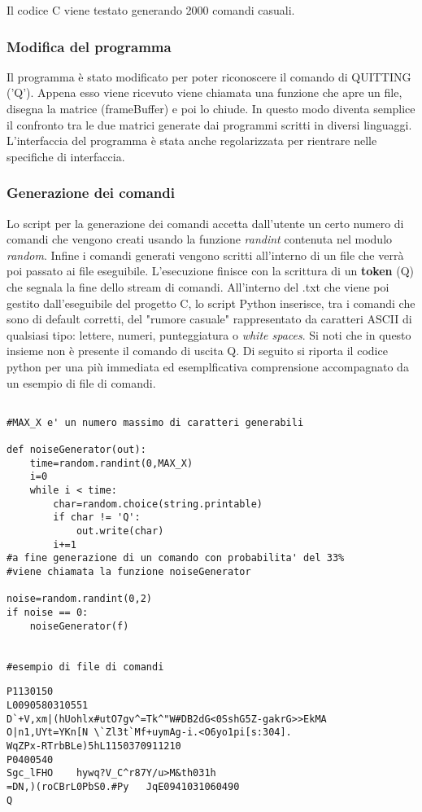 \documentclass{article}
\begin{document}
	Il codice C viene testato generando 2000 comandi casuali.

	\subsubsection*{Modifica del programma}
		Il programma è stato modificato per poter riconoscere il comando di QUITTING ('Q'). Appena esso viene ricevuto
		viene chiamata una funzione che apre un file, disegna la matrice (frameBuffer) e poi lo chiude. In questo modo 
		diventa semplice il confronto tra le due matrici generate dai programmi scritti in diversi linguaggi.
		L'interfaccia del programma è stata anche regolarizzata per rientrare nelle specifiche di interfaccia.

	\subsubsection*{Generazione dei comandi}
		Lo script per la generazione dei comandi accetta dall'utente un certo numero di comandi che vengono creati usando la funzione \textit{randint} contenuta nel modulo \textit{random}. Infine i comandi generati vengono scritti all'interno di un file che verrà poi passato ai file eseguibile.
		L'esecuzione finisce con la scrittura di un \textbf{token} (Q) che segnala la fine dello stream di comandi.
		All'interno del .txt che viene poi gestito dall'eseguibile del progetto C, lo script Python inserisce, tra i comandi che sono di default corretti, del "rumore casuale" rappresentato da caratteri ASCII di qualsiasi tipo: lettere, numeri, punteggiatura o \textit{white spaces}. Si noti che in questo insieme non è presente il comando di uscita Q.
		Di seguito si riporta il codice python per una più immediata ed esemplficativa comprensione accompagnato da un esempio di file di comandi.
\begin{verbatim}
		
#MAX_X e' un numero massimo di caratteri generabili

def noiseGenerator(out):
	time=random.randint(0,MAX_X)
	i=0
	while i < time:
		char=random.choice(string.printable)
		if char != 'Q':
			out.write(char)
		i+=1
#a fine generazione di un comando con probabilita' del 33% 
#viene chiamata la funzione noiseGenerator

noise=random.randint(0,2)
if noise == 0:
	noiseGenerator(f)


#esempio di file di comandi
\end{verbatim}
\begin{lstlisting}
P1130150
L0090580310551
D`+V,xm|(hUohlx#utO7gv^=Tk^"W#DB2dG<0SshG5Z-gakrG>>EkMA
O|n1,UYt=YKn[N \`Zl3t`Mf+uymAg-i.<O6yo1pi[s:304].
WqZPx-RTrbBLe)5hL1150370911210
P0400540
Sgc_lFHO	hywq?V_C^r87Y/u>M&th031h
=DN,)(roCBrL0PbS0.#Py	JqE0941031060490
Q
		\end{lstlisting}
\end{document}
